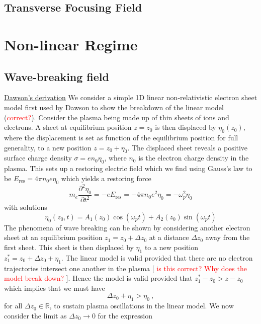 \subsection{Transverse Focusing Field} 



\clearpage
\section{Non-linear Regime} 
\subsection{Wave-breaking field}
\underline{Dawson's derivation}
We consider a simple 1D linear non-relativistic electron sheet model first used by Dawson \citep{Dawson1959} to show the breakdown of the linear model (\textcolor{red}{correct?}). Consider the plasma being made up of thin sheets of ions and electrons. A sheet at equilibrium position $z=z_0$ is then displaced by $\eta_0(z_0)$, where the displacement is set as function of the equilibrium position for full generality, to a new position $z=z_0+\eta_0$. The displaced sheet reveals a positive surface charge density $\sigma=en_0\eta_0$, where $n_0$ is the electron charge density in the plasma. This sets up a restoring electric field which we find using Gauss's law to be $E_{\text{res}}=4\pi n_0e\eta_0$ which yields a restoring force
\begin{equation}
 m_e\frac{\partial^2\eta_0}{\partial t^2}=-eE_{\text{res}}=-4\pi n_0e^2\eta_0=-\omega_p^2\eta_0
 \end{equation} 
 with solutions 
 \begin{equation}
 \eta_0(z_0,t)=A_1(z_0)\cos(\omega_p t)+A_2(z_0)\sin(\omega_p t)
 \end{equation}
The phenomena of wave breaking can be shown by considering another electron sheet at an equilibrium position $z_1=z_0+\Delta z_0$ at a distance $\Delta z_0$ away from the first sheet. This sheet is then displaced by $\eta_1$ to a new position $z^{*}_1=z_0+\Delta z_0+\eta_1$. The linear model is valid provided that there are no electron trajectories intersect one another in the plasma [ \textcolor{red}{is this correct? Why does the model break down?} ]. Hence the model is valid provided that $z^{*}_1-z_0>z-z_0$ which implies that we must have
\begin{equation}
\Delta z_0+\eta_1>\eta_0~,
\label{eta_ineq}
\end{equation}
for all $\Delta z_0\in \mathbb{R}$, to sustain plasma oscillations in the linear model. We now consider  the limit as $\Delta z_0\to 0$ for the expression 
